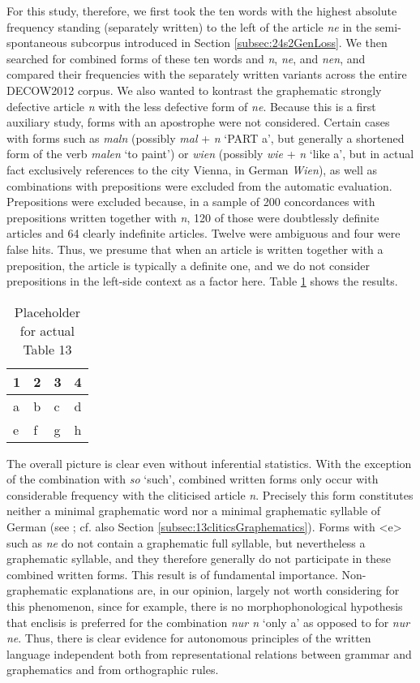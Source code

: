 For this study, therefore, we first took the ten words with the highest absolute frequency standing (separately written) to the left of the article \textit{ne} in the semi-spontaneous subcorpus introduced in Section \ref{subsec:24s2GenLoss}.
We then searched for combined forms of these ten words and \textit{n}, \textit{ne}, and \textit{nen}, and compared their frequencies with the separately written variants across the entire DECOW2012 corpus.
We also wanted to kontrast the graphematic strongly defective article \textit{n} with the less defective form of \textit{ne}. 
Because this is a first auxiliary study, forms with an apostrophe were not considered.
Certain cases with forms such as \textit{maln} (possibly \textit{mal} + \textit{n} `\textsc{PART} a', but generally a shortened form of the verb \textit{malen} `to paint') or \textit{wien} (possibly \textit{wie} + \textit{n} `like a', but in actual fact exclusively references to the city Vienna, in German \textit{Wien}), as well as combinations with prepositions were excluded from the automatic evaluation.
Prepositions were excluded because, in a sample of 200 concordances with prepositions written together with \textit{n}, 120 of those were doubtlessly definite articles and 64 clearly indefinite articles. 
Twelve were ambiguous and four were false hits.
Thus, we presume that when an article is written together with a preposition, the article is typically a definite one, and we do not consider prepositions in the left-side context as a factor here.
Table \ref{tab:0013} shows the results.

\begin{table}
	\centering
	\begin{tabular}{llll}
		\toprule
		\textbf{1} & \textbf{2} & \textbf{3} & \textbf{4} \\
		\midrule
		a & b & c & d \\
		e & f & g & h \\
		\bottomrule
	\end{tabular}
	\caption{Placeholder for actual Table 13}
	\label{tab:0013}
\end{table}

The overall picture is clear even without inferential statistics.
With the exception of the combination with \textit{so} `such', combined written forms only occur with considerable frequency with the cliticised article \textit{n}.
Precisely this form constitutes neither a minimal graphematic word nor a minimal graphematic syllable of German (see \citealt{Jacobs2005, Fuhrhop2008}; cf. also Section \ref{subsec:13cliticsGraphematics}).
Forms with <e> such as \textit{ne} do not contain a graphematic full syllable, but nevertheless a graphematic syllable, and they therefore generally do not participate in these combined written forms.
This result is of fundamental importance.
Non-graphematic explanations are, in our opinion, largely not worth considering for this phenomenon, since for example, there is no morphophonological hypothesis that enclisis is preferred for the combination \textit{nur n} `only a' as opposed to for \textit{nur ne}.
Thus, there is clear evidence for autonomous principles of the written language independent both from representational relations between grammar and graphematics and from orthographic rules.

